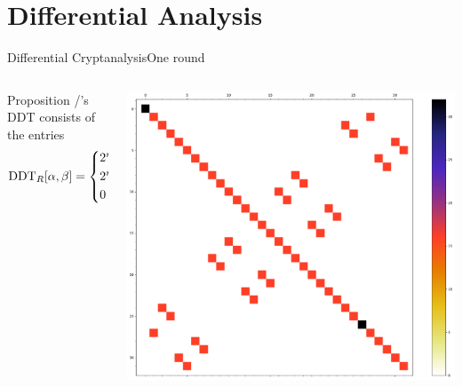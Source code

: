 \section{Differential Analysis}
\begin{frame}{Differential Cryptanalysis}{One round}
    \begin{columns}
        \begin{column}{0.49\textwidth}
            \begin{block}{Proposition}
                \bison/'s DDT consists of the entries
                \begin{equation*}
                    \text{DDT}_{R}[\alpha,\beta] = \begin{cases*}
                        2^n     & if $\alpha = \beta = k$ or $\alpha = \beta = 0$\\
                        2^{n-1} & else if $\beta \in \set{\alpha, \alpha + k}$\\
                        0       & else
                    \end{cases*}.
                \end{equation*}
            \end{block}
        \end{column}
        \begin{column}{0.49\textwidth}
            \includegraphics[width=\textwidth]{data/ddt-one-round}
        \end{column}
    \end{columns}
\end{frame}

